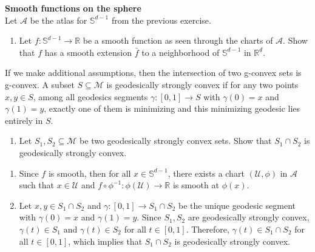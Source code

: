 \documentclass[en, oneside]{assignment}
\begin{document}
\begin{prob} \textbf{Smooth functions on the sphere}\\
    Let $\mathcal A$ be the atlas for $\mathbb S ^{d-1}$ from the previous exercise.
    \begin{enumerate}[label=(\arabic*)]
        \item Let $f: \mathbb S ^{d-1} \rightarrow \mathbb R$ be a smooth function as seen through the charts of $\mathcal A$.
        Show that $f$ has a smooth extension $\bar f$ to a neighborhood of $\mathbb S ^{d-1}$ in $\mathbb R ^d$.
    \end{enumerate}
    If we make additional assumptions, then the intersection of two g-convex sets is g-convex. 
    A subset $S \subseteq \mathcal M$ is geodesically strongly convex if for any two points $x, y \in S$, 
    among all geodesics segments $\gamma : [0, 1] \rightarrow S$ with $\gamma(0) = x$ and $\gamma(1) = y$, 
    exactly one of them is minimizing and this minimizing geodesic lies entirely in $S$.
    \begin{enumerate}[label=(\arabic*), resume]
        \item Let $S_1, S_2 \subseteq \mathcal M$ be two geodesically strongly convex sets. Show that $S_1 \cap S_2$ is geodesically strongly convex.
    \end{enumerate}
    
\end{prob}

\begin{sol}
    \begin{enumerate}[label=(\arabic*)]
        \item Since $f$ is smooth, then for all $x \in \mathbb S ^{d-1}$, there exists a chart $(\mathcal U, \phi)$ in $\mathcal A$ 
        such that $x \in \mathcal U$ and $f \circ \phi^{-1} : \phi(\mathcal U) \rightarrow \mathbb R$ is smooth at $\phi(x)$.
        \item Let $x, y \in S_1 \cap S_2$ and $\gamma : [0, 1] \rightarrow S_1 \cap S_2$ be the unique geodesic segment with $\gamma(0) = x$ and $\gamma(1) = y$.
        Since $S_1, S_2$ are geodesically strongly convex, $\gamma(t) \in S_1$ and $\gamma(t) \in S_2$ for all $t \in [0, 1]$. 
        Therefore, $\gamma(t) \in S_1 \cap S_2$ for all $t \in [0, 1]$, which implies that $S_1 \cap S_2$ is geodesically strongly convex.
    \end{enumerate}
\end{sol}
\end{document}
